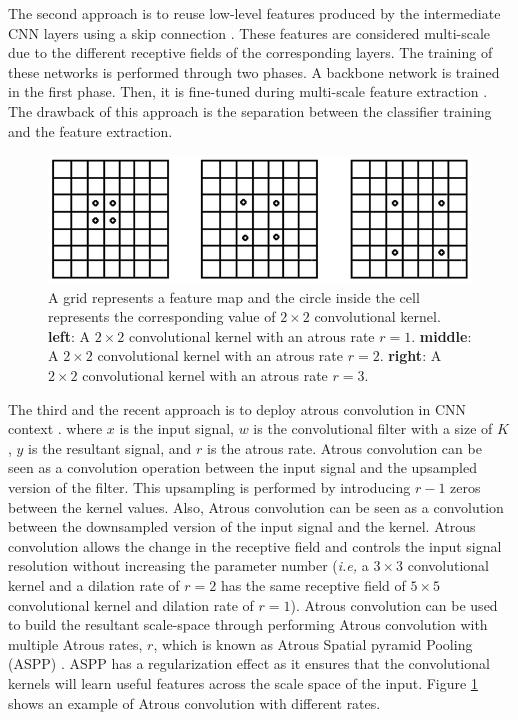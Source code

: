 The second approach is to reuse low-level features produced by the intermediate CNN layers using a skip connection \cite{chen2014semantic}\cite{hariharan2015hypercolumns}. These features are considered multi-scale due to the different receptive fields of the corresponding layers. The training of these networks is performed through two phases. A backbone network is trained in the first phase.  Then, it is fine-tuned during multi-scale feature extraction \cite{long2015fully}\cite{lin2017feature}. The drawback of this approach is the separation between the classifier training and the feature extraction.\\
\begin{center}
    \begin{figure}
    \centerline{\includegraphics[width=\textwidth]{Figures/AtrousConv.PNG}}
    \caption{A grid represents a feature map and the circle inside the cell represents the corresponding value of $2\times 2$ convolutional kernel. \textbf{left}: A $2\times 2$ convolutional kernel with an atrous rate $r=1$. \textbf{middle}: A $2\times 2$ convolutional kernel with an atrous rate $r=2$. \textbf{right}: A $2\times 2$ convolutional kernel with an atrous rate $r=3$.}
    \label{AtrousConv}
    \end{figure}
    \end{center}
The third and the recent approach is to deploy atrous convolution \cite{holschneider1990real} in CNN context \cite{chen2017deeplab}\cite{giusti2013fast}. where $x$ is the input signal, $w$ is the convolutional filter with a size of $K$, $y$ is the resultant signal, and $r$ is the atrous rate. Atrous convolution can be seen as a convolution operation between the input signal and the upsampled version of the filter. This upsampling is performed by introducing $r-1$ zeros between the kernel values. Also, Atrous convolution can be seen as a  convolution between the downsampled version of the input signal and the kernel. Atrous convolution allows the change in the receptive field and controls the input signal resolution without increasing the parameter number \cite{chen2017rethinking} (\textit{i.e,} a $3\times 3$ convolutional kernel and a dilation rate of $r=2$ has the same receptive field of $5\times 5$ convolutional kernel and dilation rate of $r=1$). Atrous convolution can be used to build the resultant scale-space through performing Atrous convolution with multiple Atrous rates, $r$, which is known as Atrous Spatial pyramid Pooling (ASPP) \cite{chen2017deeplab}. ASPP has a regularization effect as it ensures that the convolutional kernels will learn useful features across the scale space of the input. Figure \ref{AtrousConv} shows an example of  Atrous convolution with different rates. 


